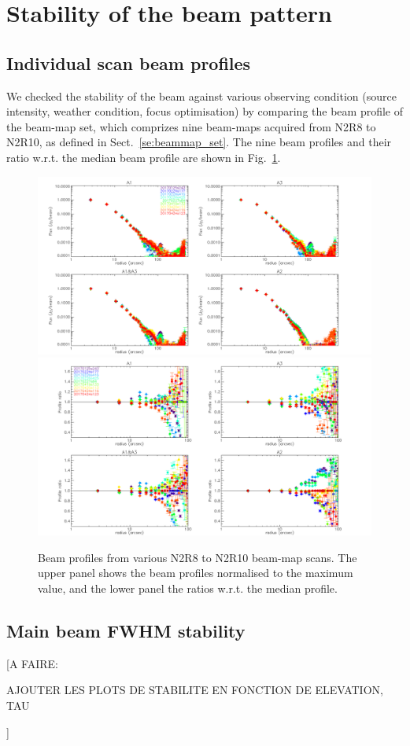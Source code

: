 
\section{Stability of the beam pattern}


\subsection{Individual scan beam profiles}

We checked the stability of the beam against various observing
condition (source intensity, weather condition, focus optimisation) by
comparing the beam profile of the beam-map set, which comprizes nine
beam-maps acquired from N2R8 to N2R10, as defined in
Sect.~\ref{se:beammap_set}.
The nine beam profiles and their ratio
w.r.t. the median beam profile are shown in Fig.~\ref{fig:beam_prof}.


\begin{figure}[h]
  \centering
  \includegraphics[clip=true,width=\textwidth]{Figures/Profile_allscans_mixed}
  \includegraphics[clip=true,width=\textwidth]{Figures/Profile_allscans_over_median_mixed}
\caption[Stability of the beam profile]{Beam profiles from various N2R8 to N2R10
  beam-map scans. The upper panel shows the beam profiles normalised
  to the maximum value, and the lower panel the ratios w.r.t. the median profile.}
  \label{fig:beam_prof}
\end{figure}


\subsection{Main beam FWHM stability}

[A FAIRE:

  AJOUTER LES PLOTS DE STABILITE EN FONCTION DE ELEVATION, TAU

]

